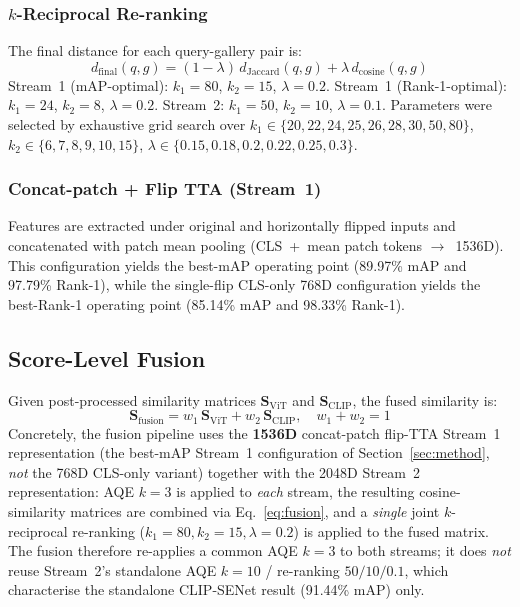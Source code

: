 \documentclass[11pt]{article}
\begin{document}
\subsubsection{$k$-Reciprocal Re-ranking~\cite{zhong2017rerank}}
The final distance for each query-gallery pair is:
\begin{equation}
  d_{\mathrm{final}}(q,g) =
    (1{-}\lambda)\,d_{\mathrm{Jaccard}}(q,g)
    + \lambda\,d_{\mathrm{cosine}}(q,g)
  \label{eq:rerank}
\end{equation}
Stream~1 (mAP-optimal): $k_1{=}80$, $k_2{=}15$, $\lambda{=}0.2$.
Stream~1 (Rank-1-optimal): $k_1{=}24$, $k_2{=}8$, $\lambda{=}0.2$.
Stream~2: $k_1{=}50$, $k_2{=}10$, $\lambda{=}0.1$. Parameters were selected
by exhaustive grid search over
$k_1\in\{20,22,24,25,26,28,30,50,80\}$,
$k_2\in\{6,7,8,9,10,15\}$,
$\lambda\in\{0.15,0.18,0.2,0.22,0.25,0.3\}$.

\subsubsection{Concat-patch + Flip TTA (Stream~1)}
Features are extracted under original and horizontally flipped inputs and
concatenated with patch mean pooling (CLS~+~mean patch tokens
$\to$~1536D). This configuration yields the best-mAP operating point
(89.97\% mAP and 97.79\% Rank-1), while the single-flip CLS-only 768D
configuration yields the best-Rank-1 operating point (85.14\% mAP and
98.33\% Rank-1).

\subsection{Score-Level Fusion}
Given post-processed similarity matrices $\mathbf{S}_{\mathrm{ViT}}$ and
$\mathbf{S}_{\mathrm{CLIP}}$, the fused similarity is:
\begin{equation}
  \mathbf{S}_{\mathrm{fusion}} =
    w_1\,\mathbf{S}_{\mathrm{ViT}} + w_2\,\mathbf{S}_{\mathrm{CLIP}},
  \quad w_1+w_2=1
  \label{eq:fusion}
\end{equation}
Concretely, the fusion pipeline uses the \textbf{1536D} concat-patch
flip-TTA Stream~1 representation (the best-mAP Stream~1 configuration of
Section~\ref{sec:method}, \emph{not} the 768D CLS-only variant) together
with the 2048D Stream~2 representation: AQE $k{=}3$ is applied to
\emph{each} stream, the resulting cosine-similarity matrices are combined
via Eq.~\eqref{eq:fusion}, and a \emph{single} joint $k$-reciprocal
re-ranking ($k_1{=}80, k_2{=}15, \lambda{=}0.2$) is applied to the fused
matrix. The fusion therefore re-applies a common AQE $k{=}3$ to both
streams; it does \emph{not} reuse Stream~2's standalone AQE $k{=}10$ /
re-ranking $50/10/0.1$, which characterise the standalone CLIP-SENet
result (91.44\% mAP) only.
\end{document}
